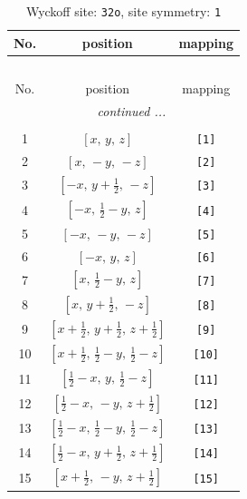 \documentclass[fleqn,8pt]{jsarticle}
\begin{document}
\renewcommand{\arraystretch}{1.2}
\begin{longtable}{ccc}
\caption{Wyckoff site: {\tt 32o}, site symmetry: {\tt 1}}
 \\
 \hline \hline
No. & position & mapping \\ \hline \endfirsthead

\multicolumn{2}{l}{\tablename\ \thetable{}} \\
 \hline \hline
No. & position & mapping \\ \hline \endhead

 \hline \hline
\multicolumn{2}{r}{\footnotesize\it continued ...} \\ \endfoot

 \hline \hline
\multicolumn{2}{r}{} \\ \endlastfoot

1 & $\left[ x,\, y,\, z \right]$ & {\tt [1]} \\ \hline
2 & $\left[ x,\, - y,\, - z \right]$ & {\tt [2]} \\ \hline
3 & $\left[ - x,\, y + \frac{1}{2},\, - z \right]$ & {\tt [3]} \\ \hline
4 & $\left[ - x,\, \frac{1}{2} - y,\, z \right]$ & {\tt [4]} \\ \hline
5 & $\left[ - x,\, - y,\, - z \right]$ & {\tt [5]} \\ \hline
6 & $\left[ - x,\, y,\, z \right]$ & {\tt [6]} \\ \hline
7 & $\left[ x,\, \frac{1}{2} - y,\, z \right]$ & {\tt [7]} \\ \hline
8 & $\left[ x,\, y + \frac{1}{2},\, - z \right]$ & {\tt [8]} \\ \hline
9 & $\left[ x + \frac{1}{2},\, y + \frac{1}{2},\, z + \frac{1}{2} \right]$ & {\tt [9]} \\ \hline
10 & $\left[ x + \frac{1}{2},\, \frac{1}{2} - y,\, \frac{1}{2} - z \right]$ & {\tt [10]} \\ \hline
11 & $\left[ \frac{1}{2} - x,\, y,\, \frac{1}{2} - z \right]$ & {\tt [11]} \\ \hline
12 & $\left[ \frac{1}{2} - x,\, - y,\, z + \frac{1}{2} \right]$ & {\tt [12]} \\ \hline
13 & $\left[ \frac{1}{2} - x,\, \frac{1}{2} - y,\, \frac{1}{2} - z \right]$ & {\tt [13]} \\ \hline
14 & $\left[ \frac{1}{2} - x,\, y + \frac{1}{2},\, z + \frac{1}{2} \right]$ & {\tt [14]} \\ \hline
15 & $\left[ x + \frac{1}{2},\, - y,\, z + \frac{1}{2} \right]$ & {\tt [15]} \\ \hline

\end{longtable}
\end{document}
